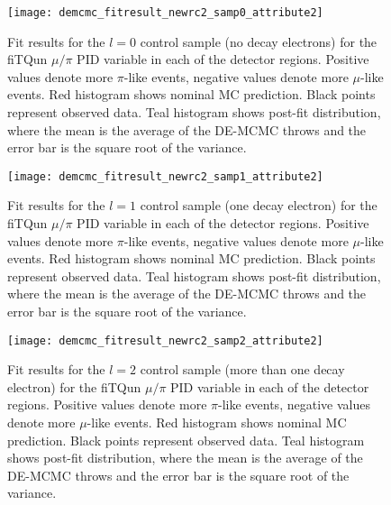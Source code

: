 \begin{figure}[h]
  \begin{center}
    \texttt{[image: demcmc\_fitresult\_newrc2\_samp0\_attribute2]} 
  \end{center}
  \caption{Fit results for the $l=0$ control sample (no decay electrons) for
  the fiTQun $\mu/\pi$ PID variable in each of the detector regions. Positive
  values denote more $\pi$-like events, negative values denote more $\mu$-like
  events. Red histogram shows nominal MC prediction.  Black points represent
  observed data.  Teal histogram shows post-fit distribution, where the mean is
  the average of the DE-MCMC throws and the error bar is the square root of the
  variance.}
  \label{fig:fitresults_samp0_att2}
\end{figure}


\begin{figure}[h]
  \begin{center}
    \texttt{[image: demcmc\_fitresult\_newrc2\_samp1\_attribute2]} 
  \end{center}
  \caption{Fit results for the $l=1$ control sample (one decay electron) for
  the fiTQun $\mu/\pi$ PID variable in each of the detector regions.  Positive
  values denote more $\pi$-like events, negative values denote more $\mu$-like
  events. Red histogram shows nominal MC prediction.  Black points represent
  observed data.  Teal histogram shows post-fit distribution, where the mean is
  the average of the DE-MCMC throws and the error bar is the square root of the
  variance.} 
  \label{fig:fitresults_samp1_att2}
\end{figure}


\begin{figure}[h]
  \begin{center}
    \texttt{[image: demcmc\_fitresult\_newrc2\_samp2\_attribute2]} 
  \end{center}
  \caption{Fit results for the $l=2$ control sample (more than one decay
  electron) for the fiTQun $\mu/\pi$ PID variable in each of the detector
  regions.  Positive values denote more $\pi$-like events, negative values
  denote more $\mu$-like events. Red histogram shows nominal MC prediction.
  Black points represent observed data.  Teal histogram shows post-fit
  distribution, where the mean is the average of the DE-MCMC throws and the
  error bar is the square root of the variance.}
  \label{fig:fitresults_samp2_att2}
\end{figure}


